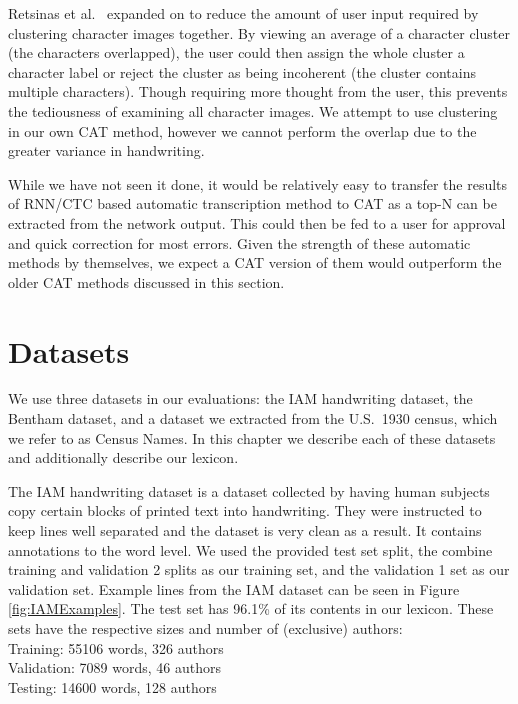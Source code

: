 \documentclass[ms,electronic,twosidetoc,letterpaper,chaptercenter,parttop,lol,lof,lot]{byumsphd}
\begin{document}
Retsinas et al.~\cite{Retsinas2015} expanded on \cite{Neudecker2010} to reduce the amount of user input required by clustering character images together. By viewing an average of a character cluster (the characters overlapped), the user could then assign the whole cluster a character label or reject the cluster as being incoherent (the cluster contains multiple characters). Though requiring more thought from the user, this prevents the tediousness of examining all character images. %
We attempt to use clustering in our own CAT method, however we cannot perform the overlap due to the greater variance in handwriting.

While we have not seen it done, it would be relatively easy to transfer the results of RNN/CTC based automatic transcription method to CAT as a top-N can be extracted from the network output. This could then be fed to a user for approval and quick correction for most errors. Given the strength of these automatic methods by themselves, we expect a CAT version of them would outperform the older CAT methods discussed in this section. 




\chapter{Datasets}\label{datasets}

We use three datasets in our evaluations: the IAM handwriting dataset, the Bentham dataset, and a dataset we extracted from the U.S.~1930 census, which we refer to as Census Names. In this chapter we describe each of these datasets and additionally describe our lexicon.

The IAM handwriting dataset \cite{IAM} is a dataset collected by having human subjects copy certain blocks of printed text into handwriting. They were instructed to keep lines well separated and the dataset is very clean as a result. It contains annotations to the word level. We used the provided test set split, the combine training and validation 2 splits as our training set, and the validation 1 set as our validation set.
Example lines from the IAM dataset can be seen in Figure \ref{fig:IAMExamples}.
The test set has 96.1\% of its contents in our lexicon.
These sets have the respective sizes and number of (exclusive) authors:\\
\indent \indent Training: 55106 words, 326 authors\\
\indent \indent Validation: 7089 words, 46 authors\\
\indent \indent Testing: 14600 words, 128 authors
\end{document}
